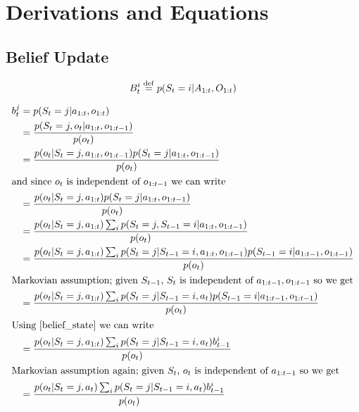 
\chapter{Derivations and Equations}
\label{app:Derivations}
\section{Belief Update}
\label{app:BeliefUpdates}
\begin{equation}
  B_t^i \stackrel{\mathrm{def}}{=} p(S_t = i | A_{1:t}, O_{1:t})
\end{equation}

\begin{subequations}\label{belief_update}
  \begin{align}
    b_t^j &= p(S_t = j | a_{1:t}, o_{1:t})\label{belief_state} \\
          &= \frac{ p(S_t = j, o_t | a_{1:t}, o_{1:t-1}) } { p(o_t) } \\
          &= \frac{ p(o_t | S_t = j, a_{1:t}, o_{1:t-1}) p(S_t = j | a_{1:t}, o_{1:t-1})} { p(o_t) } \\
          \intertext{and since $o_t$ is independent of $o_{1:t-1}$ we can write}
          &= \frac{ p(o_t | S_t = j, a_{1:t}) p(S_t = j | a_{1:t}, o_{1:t-1})} { p(o_t) } \\
          &= \frac{ p(o_t | S_t = j, a_{1:t}) \sum_{i} p(S_t = j, S_{t-1} = i | a_{1:t}, o_{1:t-1})} { p(o_t) } \\
          &= \frac{ p(o_t | S_t = j, a_{1:t}) \sum_{i} p(S_t = j | S_{t-1} = i, a_{1:t}, o_{1:t-1}) p(S_{t-1} = i | a_{1:t-1}, o_{1:t-1})} { p(o_t) } \\
          \intertext{Markovian assumption; given $S_{t-1}$, $S_t$ is independent of $a_{1:t-1}, o_{1:t-1}$ so we get}
          &= \frac{ p(o_t | S_t = j, a_{1:t}) \sum_{i} p(S_t = j | S_{t-1} = i, a_t) p(S_{t-1} = i | a_{1:t-1}, o_{1:t-1}) } { p(o_t) } \\
          \intertext{Using \eqref{belief_state} we can write}
          &= \frac{ p(o_t | S_t = j, a_{1:t}) \sum_{i} p(S_t = j | S_{t-1} = i, a_t) b_{t-1}^i } { p(o_t) } \\
          \intertext{Markovian assumption again; given $S_t$, $o_t$ is independent of $a_{1:t-1}$ so we get}
          &= \frac{ p(o_t | S_t = j, a_t) \sum_{i} p(S_t = j | S_{t-1} = i, a_t) b_{t-1}^i } { p(o_t) }
  \end{align}
\end{subequations}
